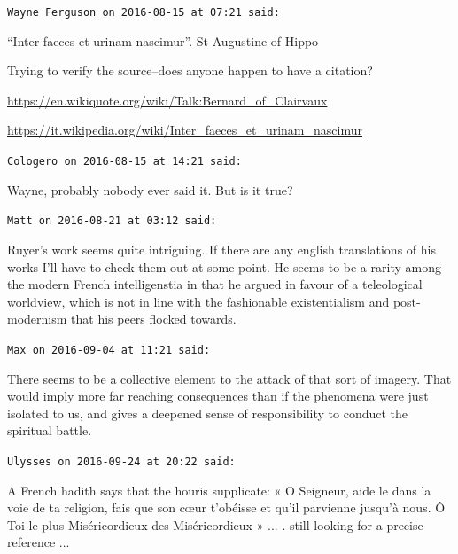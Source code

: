 \begin{footnotesize}
\begin{sffamily}
\texttt{Wayne Ferguson on 2016-08-15 at 07:21 said:}

``Inter faeces et urinam nascimur''. St Augustine of Hippo

Trying to verify the source--does anyone happen to have a citation?

\url{https://en.wikiquote.org/wiki/Talk:Bernard\_of\_Clairvaux}


\url{https://it.wikipedia.org/wiki/Inter\_faeces\_et\_urinam\_nascimur}


\hfill

\texttt{Cologero on 2016-08-15 at 14:21 said:}

Wayne, probably nobody ever said it. But is it true?

\hfill

\texttt{Matt on 2016-08-21 at 03:12 said:}

Ruyer's work seems quite intriguing. If there are any english translations of his works I'll have to check them out at some point. He seems to be a rarity among the modern French intelligenstia in that he argued in favour of a teleological worldview, which is not in line with the fashionable existentialism and post-modernism that his peers flocked towards.

\hfill

\texttt{Max on 2016-09-04 at 11:21 said:}

There seems to be a collective element to the attack of that sort of imagery. That would imply more far reaching consequences than if the phenomena were just isolated to us, and gives a deepened sense of responsibility to conduct the spiritual battle.

\hfill

\texttt{Ulysses on 2016-09-24 at 20:22 said:}

A French hadith says that the houris supplicate: « O Seigneur, aide le dans la voie de ta religion, fais que son cœur t'obéisse et qu'il parvienne jusqu'à nous. Ô Toi le plus Miséricordieux des Miséricordieux » ... . still looking for a precise reference ... 

\hfill

\end{sffamily}
\end{footnotesize}

